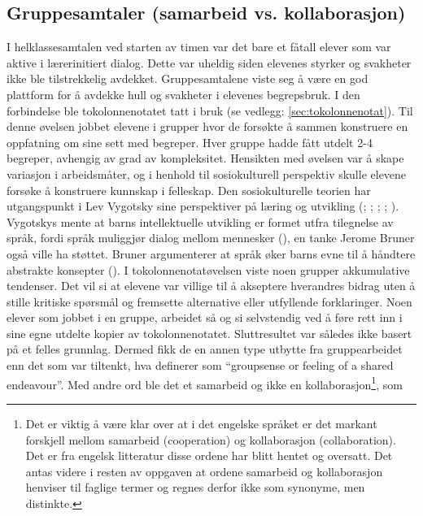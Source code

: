 \documentclass[main.tex]{subfiles}
\begin{document}
\subsection*{Gruppesamtaler (samarbeid vs. kollaborasjon)}
I helklassesamtalen ved starten av timen var det bare et fåtall elever som var aktive i lærerinitiert 
dialog. Dette var uheldig siden elevenes styrker og svakheter ikke ble tilstrekkelig avdekket. 
Gruppesamtalene viste seg å være en god plattform for å avdekke hull og svakheter i elevenes 
begrepsbruk. I den forbindelse ble tokolonnenotatet tatt i bruk (se vedlegg: \ref{sec:tokolonnenotat}).
Til denne øvelsen jobbet elevene i grupper hvor de forsøkte å sammen konstruere en oppfatning om
sine sett med begreper. Hver gruppe hadde fått utdelt 2-4 begreper, avhengig av grad av kompleksitet.
Hensikten med øvelsen var å skape variasjon i arbeidsmåter, og i henhold til sosiokulturell perspektiv
skulle elevene forsøke å konstruere kunnskap i felleskap. Den sosiokulturelle teorien har utgangspunkt 
i Lev Vygotsky sine perspektiver på læring og utvikling (; ; 
; ; ). Vygotskys mente at barns 
intellektuelle utvikling er formet utfra tilegnelse av språk, fordi språk muliggjør dialog mellom 
mennesker (), en tanke Jerome Bruner også ville ha støttet. Bruner argumenterer 
at språk øker barns evne til å håndtere abstrakte konsepter ().
\newline
\newline
I tokolonnenotatøvelsen viste noen grupper akkumulative tendenser. Det vil si at elevene 
var villige til å akseptere hverandres bidrag uten å stille kritiske spørsmål og fremsette
alternative eller utfyllende forklaringer. Noen elever som jobbet i en gruppe, arbeidet så og si
selvstendig ved å føre rett inn i sine egne utdelte kopier av tokolonnenotatet. Sluttresultet var
således ikke basert på et felles grunnlag. Dermed fikk de en annen type utbytte fra gruppearbeidet
enn det som var tiltenkt, hva   definerer som ``groupsense or feeling of a 
shared endeavour''. Med andre ord ble det et samarbeid og ikke en kollaborasjon\footnote[3]{Det 
er viktig å være klar over at i det engelske språket er det markant forskjell mellom samarbeid 
(cooperation) og kollaborasjon (collaboration). Det er fra engelsk litteratur disse ordene 
har blitt hentet og oversatt. Det antas videre i resten av oppgaven at ordene samarbeid og kollaborasjon 
henviser til faglige termer og regnes derfor ikke som synonyme, men distinkte.}, som  
\end{document}
